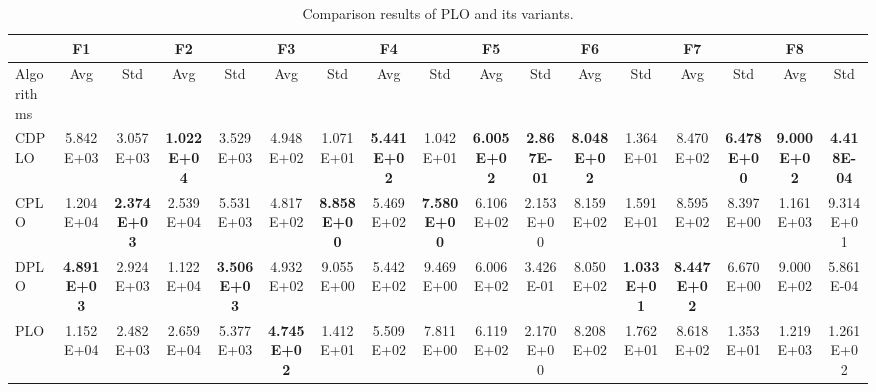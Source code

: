 \documentclass[review]{elsarticle}
\begin{document}
\begin{table}
\centering
\caption{Comparison results of PLO and its variants.}
\label{table: CDPLO-Ablation}
\begin{tabular}{@{}lcccccccccccccccc@{}}
\toprule
           & F1                 &                    & F2                 &                    & F3                 &                    & F4                 &                    & F5                 &                    & F6                   &                     & F7                 &                    & F8                 &                    \\ \midrule
Algorithms & Avg                & Std                & Avg                & Std                & Avg                & Std                & Avg                & Std                & Avg                & Std                & Avg                  & Std                 & Avg                & Std                & Avg                & Std                \\
CDPLO      & 5.842E+03          & 3.057E+03          & \textbf{1.022E+04} & 3.529E+03          & 4.948E+02          & 1.071E+01          & \textbf{5.441E+02} & 1.042E+01          & \textbf{6.005E+02} & \textbf{2.867E-01} & \textbf{8.048E+02}   & 1.364E+01           & 8.470E+02          & \textbf{6.478E+00} & \textbf{9.000E+02} & \textbf{4.418E-04} \\
CPLO       & 1.204E+04          & \textbf{2.374E+03} & 2.539E+04          & 5.531E+03          & 4.817E+02          & \textbf{8.858E+00} & 5.469E+02          & \textbf{7.580E+00} & 6.106E+02          & 2.153E+00          & 8.159E+02            & 1.591E+01           & 8.595E+02          & 8.397E+00          & 1.161E+03          & 9.314E+01          \\
DPLO       & \textbf{4.891E+03} & 2.924E+03          & 1.122E+04          & \textbf{3.506E+03} & 4.932E+02          & 9.055E+00          & 5.442E+02          & 9.469E+00          & 6.006E+02          & 3.426E-01          & 8.050E+02            & \textbf{1.033E+01}  & \textbf{8.447E+02} & 6.670E+00          & 9.000E+02          & 5.861E-04          \\
PLO        & 1.152E+04          & 2.482E+03          & 2.659E+04          & 5.377E+03          & \textbf{4.745E+02} & 1.412E+01          & 5.509E+02          & 7.811E+00          & 6.119E+02          & 2.170E+00          & 8.208E+02            & 1.762E+01           & 8.618E+02          & 1.353E+01          & 1.219E+03          & 1.261E+02          \\

\end{tabular}
\end{table}
\end{document}
